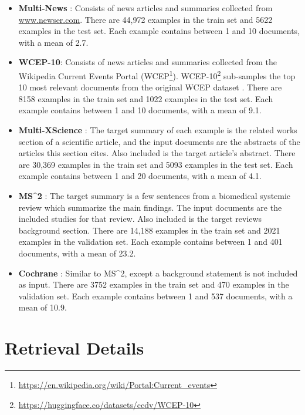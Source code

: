 \documentclass[11pt]{article}
\newcommand\mstoo{{MS\^{}2}\xspace}
\begin{document}
\begin{itemize}
    \item \textbf{Multi-News} \citep{fabbri-etal-2019-multi}: Consists of news articles and summaries collected from \url{www.newser.com}. There are 44,972 examples in the train set and 5622 examples in the test set. Each example contains between 1 and 10 documents, with a mean of 2.7.
    \item \textbf{WCEP-10}: Consists of news articles and summaries collected from the Wikipedia Current Events Portal (WCEP\footnote{\url{https://en.wikipedia.org/wiki/Portal:Current_events}}). WCEP-10\footnote{\label{wcep-10}\url{https://huggingface.co/datasets/ccdv/WCEP-10}} sub-samples the top 10 most relevant documents from the original WCEP dataset \citep{gholipour-ghalandari-etal-2020-large}. There are 8158 examples in the train set and 1022 examples in the test set. Each example contains between 1 and 10 documents, with a mean of 9.1.
    \item \textbf{Multi-XScience} \citep{lu-etal-2020-multi-xscience}: The target summary of each example is the related works section of a scientific article, and the input documents are the abstracts of the articles this section cites. Also included is the target article's abstract. There are 30,369 examples in the train set and 5093 examples in the test set. Each example contains between 1 and 20 documents, with a mean of 4.1.
    \item \textbf{\mstoo} \citep{deyoung-etal-2021-ms}: The target summary is a few sentences from a biomedical systemic review which summarize the main findings. The input documents are the included studies for that review. Also included is the target reviews background section. There are 14,188 examples in the train set and 2021 examples in the validation set. Each example contains between 1 and 401 documents, with a mean of 23.2.
    \item \textbf{Cochrane} \citep{cochrane}: Similar to \mstoo, except a background statement is not included as input. There are 3752 examples in the train set and 470 examples in the validation set. Each example contains between 1 and 537 documents, with a mean of 10.9.
\end{itemize}

\section{Retrieval Details}
\label{appendix:retrieval}
\end{document}
